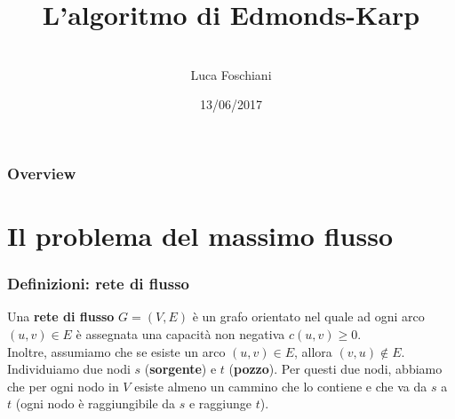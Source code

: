 \documentclass{beamer}
\title[L'algoritmo di Edmonds-Karp]{L'algoritmo di Edmonds-Karp } %
\author{\\Luca Foschiani} %
\institute[] %
{
Università degli studi di Udine \\ %
\medskip
Advanced Algorithms
}
\date{13/06/2017} %
\begin{document}
\begin{frame}
\titlepage %
\end{frame}

\begin{frame}
\frametitle{Overview} %
\tableofcontents %
\end{frame}


\section{Il problema del massimo flusso} %


\begin{frame}
\frametitle{Definizioni: rete di flusso}
Una \textbf{rete di flusso} $G=(V,E)$ è un grafo orientato nel quale ad ogni arco $(u,v)\in E$ è assegnata una capacità non negativa $c(u,v)\geq 0$.\\
Inoltre, assumiamo che se esiste un arco $(u,v)\in E$, allora $(v,u)\notin E$.\\
Individuiamo due nodi $s$ (\textbf{sorgente}) e $t$ (\textbf{pozzo}). Per questi due nodi, abbiamo che per ogni nodo in $V$ esiste almeno un cammino che lo contiene e che va da $s$ a $t$ (ogni nodo è raggiungibile da $s$ e raggiunge $t$).
\end{frame}
\end{document}
